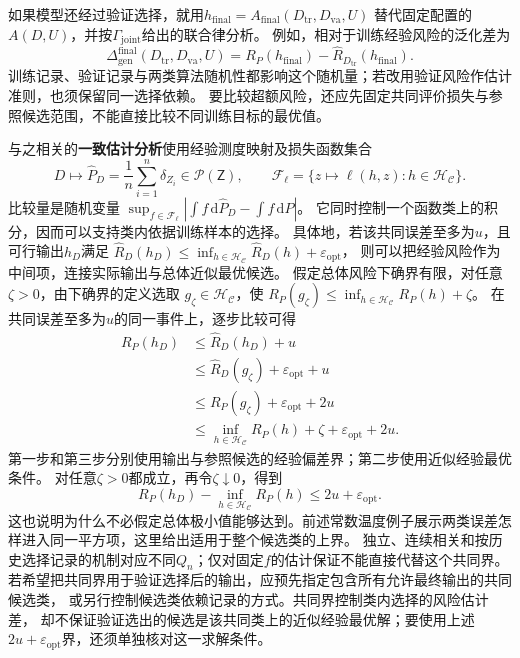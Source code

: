 如果模型还经过验证选择，就用$h_{\mathrm{final}}=A_{\mathrm{final}}(D_{\mathrm{tr}},D_{\mathrm{va}},U)$
替代固定配置的$A(D,U)$，并按$\Gamma_{\mathrm{joint}}$给出的联合律分析。
例如，相对于训练经验风险的泛化差为
\[
  \Delta_{\mathrm{gen}}^{\mathrm{final}}(D_{\mathrm{tr}},D_{\mathrm{va}},U)
  =R_P(h_{\mathrm{final}})
   -\widehat R_{D_{\mathrm{tr}}}(h_{\mathrm{final}}).
\]
训练记录、验证记录与两类算法随机性都影响这个随机量；若改用验证风险作估计准则，也须保留同一选择依赖。
要比较超额风险，还应先固定共同评价损失与参照候选范围，不能直接比较不同训练目标的最优值。

与之相关的\textbf{一致估计分析}使用经验测度映射及损失函数集合
\[
  D\mapsto\widehat P_D=\frac1n\sum_{i=1}^n\delta_{Z_i}
     \in\mathcal P(\mathsf Z),\qquad
  \mathcal F_\ell=\{z\mapsto\ell(h,z):h\in\mathcal H_{\mathcal C}\}.
\]
比较量是随机变量
$\sup_{f\in\mathcal F_\ell}|\int f\,\mathrm d\widehat P_D-\int f\,\mathrm dP|$。
它同时控制一个函数类上的积分，因而可以支持类内依据训练样本的选择。
具体地，若该共同误差至多为$u$，且可行输出$h_D$满足
$\widehat R_D(h_D)\leq\inf_{h\in\mathcal H_{\mathcal C}}\widehat R_D(h)+\varepsilon_{\mathrm{opt}}$，
则可以把经验风险作为中间项，连接实际输出与总体近似最优候选。
假定总体风险下确界有限，对任意$\zeta>0$，由下确界的定义选取
$g_\zeta\in\mathcal H_{\mathcal C}$，使
$R_P(g_\zeta)\leq\inf_{h\in\mathcal H_{\mathcal C}}R_P(h)+\zeta$。
在共同误差至多为$u$的同一事件上，逐步比较可得
\[
 \begin{aligned}
 R_P(h_D)
   &\leq\widehat R_D(h_D)+u\\
   &\leq\widehat R_D(g_\zeta)+\varepsilon_{\mathrm{opt}}+u\\
   &\leq R_P(g_\zeta)+\varepsilon_{\mathrm{opt}}+2u\\
   &\leq\inf_{h\in\mathcal H_{\mathcal C}}R_P(h)
          +\zeta+\varepsilon_{\mathrm{opt}}+2u.
 \end{aligned}
\]
第一步和第三步分别使用输出与参照候选的经验偏差界；第二步使用近似经验最优条件。
对任意$\zeta>0$都成立，再令$\zeta\downarrow0$，得到
\[
 R_P(h_D)-\inf_{h\in\mathcal H_{\mathcal C}}R_P(h)
 \leq 2u+\varepsilon_{\mathrm{opt}}.
\]
这也说明为什么不必假定总体极小值能够达到。前述常数温度例子展示两类误差怎样进入同一平方项，这里给出适用于整个候选类的上界。
独立、连续相关和按历史选择记录的机制对应不同$Q_n$；仅对固定$f$的估计保证不能直接代替这个共同界。
若希望把共同界用于验证选择后的输出，应预先指定包含所有允许最终输出的共同候选类，
或另行控制候选类依赖记录的方式。共同界控制类内选择的风险估计差，
却不保证验证选出的候选是该共同类上的近似经验最优解；要使用上述$2u+\varepsilon_{\mathrm{opt}}$界，还须单独核对这一求解条件。

